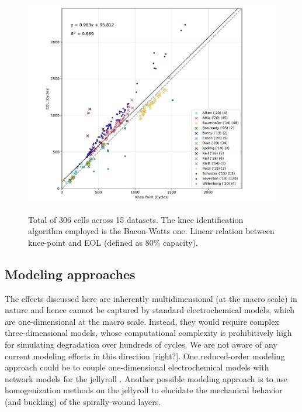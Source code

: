 \documentclass[journal=jpcl, manuscript=article, layout=onecolumn]{achemso}
\begin{document}
\begin{figure}[ht]
\centering
\includegraphics[scale=1.0]{figures/AcrossDatasetsknee-to-EOL}
  \label{fig:kneepoint2EOL}
\caption{Total of 306 cells across 15 datasets. The knee identification algorithm employed is the Bacon-Watts one. Linear relation between knee-point and EOL (defined as 80\% capacity).}
\label{fig:knees2EOL}
\end{figure}

\subsection{Modeling approaches}

The effects discussed here are inherently multidimensional (at the macro scale) in nature and hence cannot be captured by standard electrochemical models, which are one-dimensional at the macro scale. Instead, they would require complex three-dimensional models, whose computational complexity is prohibitively high for simulating degradation over hundreds of cycles. We are not aware of any current modeling efforts in this direction [right?]. One reduced-order modeling approach could be to couple one-dimensional electrochemical models with network models for the jellyroll \cite{tranter_probing_2020}. Another possible modeling approach is to use homogenization methods on the jellyroll \cite{psaltis_homogenisation_2020} to elucidate the mechanical behavior (and buckling) of the spirally-wound layers.
\end{document}
